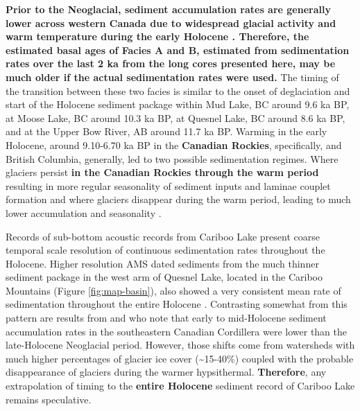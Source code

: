 \documentclass[Royal,times,doublespace,sageh]{sagej}
\begin{document}
\textbf{Prior to the Neoglacial, sediment accumulation rates are
generally lower across western Canada due to widespread glacial activity
and warm temperature during the early Holocene
\citep{Steinman2019, Menounos2004, Koch2007a, Osborn2007, Luckman1988, Luckman1993}.
Therefore, the estimated basal ages of Facies A and B, estimated from
sedimentation rates over the last 2 ka from the long cores presented
here, may be much older if the actual sedimentation rates were used.}
The timing of the transition between these two facies is similar to the
onset of deglaciation and start of the Holocene sediment package within
Mud Lake, BC \citep{Hodder2006b} around 9.6 ka BP, at Moose Lake, BC
\citep{Desloges1999} around 10.3 ka BP, at Quesnel Lake, BC
\citep{Gilbert2012} around 8.6 ka BP, and at the Upper Bow River, AB
\citep{Leonard1999} around 11.7 ka BP. Warming in the early Holocene,
around 9.10-6.70 ka BP in the \textbf{Canadian Rockies}, specifically,
\citep{Luckman1986} and British Columbia, generally,
\citep{Clague1989, Steinman2019} led to two possible sedimentation
regimes. Where glaciers persist \textbf{in the Canadian Rockies through
the warm period} resulting in more regular seasonality of sediment
inputs and laminae couplet formation \citep[e.g.~Mud
Lake,][]{Hodder2006b} and where glaciers disappear during the warm
period, leading to much lower accumulation and seasonality
\citep[e.g.~Moose Lake,][]{Desloges1999}.

Records of sub-bottom acoustic records from Cariboo Lake present coarse
temporal scale resolution of continuous sedimentation rates throughout
the Holocene. Higher resolution AMS dated sediments from the much
thinner sediment package in the west arm of Quesnel Lake, located in the
Cariboo Mountains (Figure \ref{fig:map-basin}), also showed a very
consistent mean rate of sedimentation throughout the entire Holocene
\citep{Gilbert2012}. Contrasting somewhat from this pattern are results
from \citet{Menounos2004} and \citet{Desloges1999} who note that early
to mid-Holocene sediment accumulation rates in the southeastern Canadian
Cordillera were lower than the late-Holocene Neoglacial period. However,
those shifts come from watersheds with much higher percentages of
glacier ice cover (\textasciitilde15-40\%) coupled with the probable
disappearance of glaciers during the warmer hypsithermal.
\textbf{Therefore}, any extrapolation of timing to the \textbf{entire
Holocene} sediment record of Cariboo Lake remains speculative.
\end{document}
